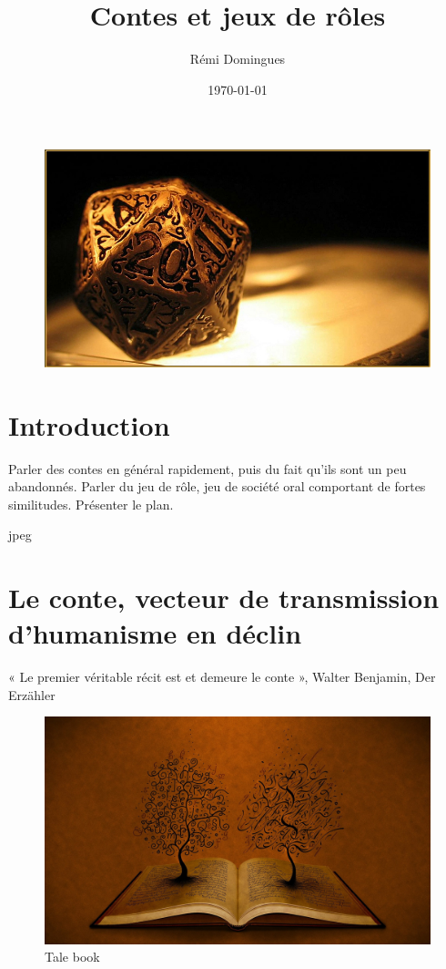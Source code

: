 \documentclass[a4paper,12pt,final,oneside]{article}
\title{Contes et jeux de rôles}
\author{Rémi Domingues}
\date{\today}
\begin{document}
\maketitle

\begin{figure}[h!]
    \centering
    \includegraphics[width=0.80\linewidth]{img/die.jpg}
\end{figure}

\clearpage


\thispagestyle{empty}
\tableofcontents
\clearpage


\section{Introduction}
\setcounter{page}{1}

Parler des contes en général rapidement, puis du fait qu'ils sont un peu abandonnés. Parler du jeu de rôle, jeu de société oral comportant de fortes similitudes.
Présenter le plan.

\clearpage

jpeg
\section{Le conte, vecteur de transmission d'humanisme en déclin}

« Le premier véritable récit est et demeure le conte », Walter Benjamin, Der Erzähler\cite{benjamin1991gesammelte}

\begin{figure}[h!]
    \centering
    \includegraphics[width=0.80\linewidth]{img/tale_book.jpg}
    \caption{Tale book}
\end{figure}
\end{document}
